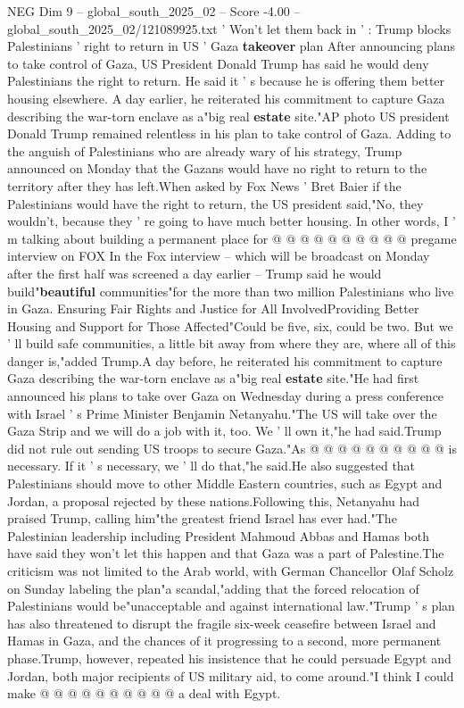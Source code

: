 \begin{textsample}{NEG Dim 9 – global\_south\_2025\_02 – Score -4.00 – global\_south\_2025\_02/121089925.txt}  \label{ex:f9_neg_061}
' Won't let them back in ' : Trump blocks Palestinians ' right to return in US ' Gaza \textbf{takeover} plan After announcing plans to take control of Gaza, US President Donald Trump has said he would deny Palestinians the right to return.
He said it ' s because he is offering them better housing elsewhere.
A day earlier, he reiterated his commitment to capture Gaza describing the war-torn enclave as a"big real \textbf{estate} site."AP photo US president Donald Trump remained relentless in his plan to take control of Gaza.
Adding to the anguish of Palestinians who are already wary of his strategy, Trump announced on Monday that the Gazans would have no right to return to the territory after they has left.When asked by Fox News ' Bret Baier if the Palestinians would have the right to return, the US president said,"No, they wouldn't, because they ' re going to have much better housing.
In other words, I ' m talking about building a permanent place for @ @ @ @ @ @ @ @ @ @ pregame interview on FOX In the Fox interview -- which will be broadcast on Monday after the first half was screened a day earlier -- Trump said he would build"\textbf{beautiful} communities"for the more than two million Palestinians who live in Gaza.
Ensuring Fair Rights and Justice for All InvolvedProviding Better Housing and Support for Those Affected"Could be five, six, could be two.
But we ' ll build safe communities, a little bit away from where they are, where all of this danger is,"added Trump.A day before, he reiterated his commitment to capture Gaza describing the war-torn enclave as a"big real \textbf{estate} site."He had first announced his plans to take over Gaza on Wednesday during a press conference with Israel ' s Prime Minister Benjamin Netanyahu."The US will take over the Gaza Strip and we will do a job with it, too.
We ' ll own it,"he had said.Trump did not rule out sending US troops to secure Gaza."As @ @ @ @ @ @ @ @ @ @ is necessary.
If it ' s necessary, we ' ll do that,"he said.He also suggested that Palestinians should move to other Middle Eastern countries, such as Egypt and Jordan, a proposal rejected by these nations.Following this, Netanyahu had praised Trump, calling him"the greatest friend Israel has ever had."The Palestinian leadership including President Mahmoud Abbas and Hamas both have said they won't let this happen and that Gaza was a part of Palestine.The criticism was not limited to the Arab world, with German Chancellor Olaf Scholz on Sunday labeling the plan"a scandal,"adding that the forced relocation of Palestinians would be"unacceptable and against international law."Trump ' s plan has also threatened to disrupt the fragile six-week ceasefire between Israel and Hamas in Gaza, and the chances of it progressing to a second, more permanent phase.Trump, however, repeated his insistence that he could persuade Egypt and Jordan, both major recipients of US military aid, to come around."I think I could make @ @ @ @ @ @ @ @ @ @ a deal with Egypt.

\end{textsample}
